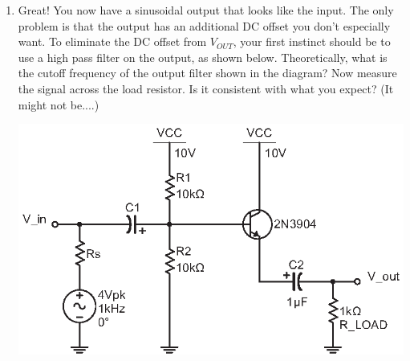 \begin{enumerate}[wide]
\pagebreak[3]
\item Great!  You now have a sinusoidal output that looks like the input.  The only problem is that the output has an additional DC offset you don't especially want.  To eliminate the DC offset from $V_{OUT}$, your first instinct should be to use a high pass filter on the output, as shown below.  Theoretically, what is the cutoff frequency of the output filter shown in the diagram?  Now measure the signal across the load resistor.  Is it consistent with what you expect?  (It might not be....)
\begin{center}
\vspace{-0.08in}
\includegraphics{bjt/biased_output_and_input_incorrect.eps}
\vspace{-0.08in}
\end{center}


\end{enumerate}
